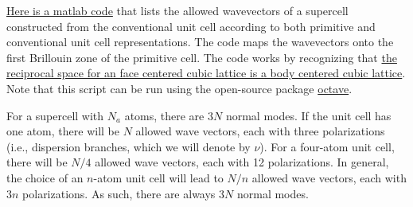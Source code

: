 \href{https://github.com/jasonlarkin/disorder/blob/master/matlab/m_lj_prim_conv_mapping.m}
{Here is a matlab code} that lists the allowed wavevectors of a supercell 
constructed from the conventional unit cell according to both 
primitive and conventional unit cell representations. The code maps 
the wavevectors onto the first Brillouin zone of the primitive cell. 
The code works by recognizing that 
\href{http://en.wikipedia.org/wiki/Reciprocal_lattice#Face-centered_cubic_.28FCC.29_lattice}
{the reciprocal space for an face centered cubic lattice is a body centered cubic lattice}. 
Note that this script can be run using the open-source package 
\href{http://www.gnu.org/software/octave/}{octave}.

For a supercell with $N_a$ atoms, there 
are $3N$ normal modes. If the unit cell has one atom, there will be $N$ 
allowed wave vectors, each with three polarizations (i.e., dispersion 
branches, which we will denote by $\nu$). For a four-atom unit cell, 
there will be $N/4$ allowed wave vectors, each with 12 polarizations. 
In general, the choice of an $n$-atom unit cell will lead to $N/n$ 
allowed wave vectors, each with 3$n$ polarizations. As such, there are 
always $3N$ normal modes.

